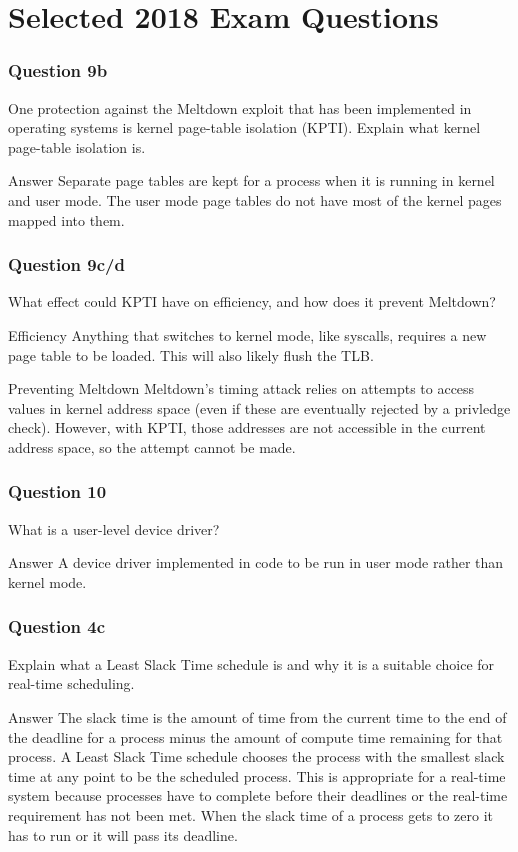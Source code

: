 \documentclass{beamer}
\begin{document}
\section{Selected 2018 Exam Questions}
\begin{frame}
  \frametitle{Question 9b}
  One protection against the Meltdown exploit that has been implemented in operating systems is kernel page-table isolation (KPTI). Explain what kernel page-table isolation is.
  \pause
  \begin{block}{Answer}
    Separate page tables are kept for a process when it is running in kernel and user mode. The user mode page tables do not have most of the kernel pages mapped into them.
  \end{block}
\end{frame}
\begin{frame}
  \frametitle{Question 9c/d}
  What effect could KPTI have on efficiency, and how does it prevent Meltdown?
  \pause
  \begin{block}{Efficiency}
    Anything that switches to kernel mode, like syscalls, requires a new page table to be loaded. This will also likely flush the TLB.
  \end{block}
  \pause
  \begin{block}{Preventing Meltdown}
    Meltdown's timing attack relies on attempts to access values in kernel address space (even if these are eventually rejected by a privledge check). However, with KPTI, those addresses are not accessible in the current address space, so the attempt cannot be made.
  \end{block}
\end{frame}
\begin{frame}
  \frametitle{Question 10}
  What is a user-level device driver?
  \pause
  \begin{block}{Answer}
    A device driver implemented in code to be run in user mode rather than kernel mode.
  \end{block}
\end{frame}
\begin{frame}
  \frametitle{Question 4c}
  Explain what a Least Slack Time schedule is and why it is a suitable choice for real-time scheduling.
  \pause
  \begin{block}{Answer}
    The slack time is the amount of time from the current time to the end of the deadline for a process minus the amount of compute time remaining for that process. A Least Slack Time schedule chooses the process with the smallest slack time at any point to be the scheduled process. This is appropriate for a real-time system because processes have to complete before their deadlines or the real-time requirement has not been met. When the slack time of a process gets to zero it has to run or it will pass its deadline.
  \end{block}
\end{frame}
\end{document}
